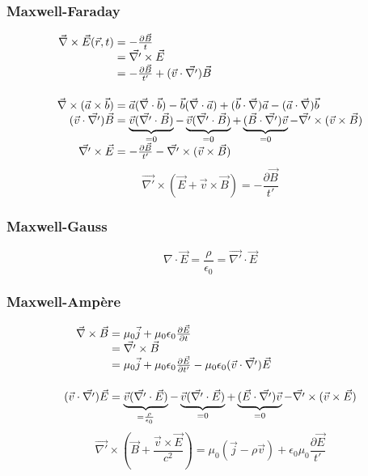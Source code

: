 \subsubsection*{Maxwell-Faraday}
$$
	\begin{array}{r@{\;}l}
		\nab\times\vec{E}(\vec{r},t)&=-\frac{\partial \vec{B}}{t}\\
			&=\vec{\nabla '}\times\vec{E}\\
			&=-\frac{\partial \vec{B}}{t'} + (\vec{v}\cdot\vec{\nabla '})\vec{B}\\[15pt]
		\nab\times(\vec{a}\times\vec{b})&=\vec{a}(\nab\cdot\vec{b})
				-\vec{b}(\nab\cdot\vec{a})
				+(\vec{b}\cdot\nab)\vec{a}
				-(\vec{a}\cdot\nab)\vec{b}\\
		(\vec{v}\cdot\vec{\nabla '})\vec{B}&=\underbrace{\vec{v}(\vec{\nabla '}\cdot\vec{B})}_{=0}
				-\underbrace{\vec{v}(\vec{\nabla '}\cdot\vec{B})}_{=0}
				+\underbrace{(\vec{B}\cdot\vec{\nabla '})\vec{v}}_{=0}
				-\vec{\nabla '}\times(\vec{v}\times\vec{B})\\
		\vec{\nabla '}\times\vec{E}&=-\frac{\partial \vec{B}}{t'}-\vec{\nabla '}\times(\vec{v}\times\vec{B})
	\end{array}
$$
$$
	\boxed{\vec{\nabla '}\times(\vec{E}+\vec{v}\times\vec{B})=-\frac{\partial \vec{B}}{t'}}	
$$
\subsubsection*{Maxwell-Gauss}
$$
	{\nabla}\cdot\vec{E}=\boxed{\frac{\rho}{\epsilon_0}=\vec{\nabla '}\cdot\vec{E}}
$$

\subsubsection*{Maxwell-Ampère}
$$
	\begin{array}{r@{\;}l}
		\nab\times\vec{B}&=\mu_0\vec{j}+\mu_0\epsilon_0\frac{\partial \vec{E}}{\partial t}\\
			&=\vec{\nabla '}\times\vec{B}\\
			&=\mu_0\vec{j}+\mu_0\epsilon_0\frac{\partial \vec{E}}{\partial t'}-\mu_0\epsilon_0(\vec{v}\cdot\vec{\nabla '})\vec{E}\\[15pt]
		(\vec{v}\cdot\vec{\nabla '})\vec{E}&=\underbrace{\vec{v}(\vec{\nabla '}\cdot\vec{E})}_{=\frac{\rho}{\epsilon_0}}
				-\underbrace{\vec{v}(\vec{\nabla '}\cdot\vec{E})}_{=0}
				+\underbrace{(\vec{E}\cdot\vec{\nabla '})\vec{v}}_{=0}
				-\vec{\nabla '}\times(\vec{v}\times\vec{E})
	\end{array}
$$
$$
	\boxed{\vec{\nabla '}\times(\vec{B}+\frac{\vec{v}\times\vec{E}}{c^2})=\mu_0(\vec{j}-\rho\vec{v})+\epsilon_0\mu_0\frac{\partial \vec{E}}{t'}}	
$$

